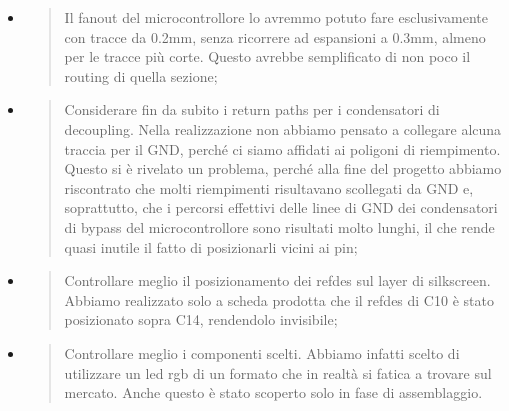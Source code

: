 \begin{itemize}
\item
  \begin{quote}
  Il fanout del microcontrollore lo avremmo potuto fare esclusivamente
  con tracce da 0.2mm, senza ricorrere ad espansioni a 0.3mm, almeno per
  le tracce più corte. Questo avrebbe semplificato di non poco il
  routing di quella sezione;
  \end{quote}
\item
  \begin{quote}
  Considerare fin da subito i return paths per i condensatori di
  decoupling. Nella realizzazione non abbiamo pensato a collegare alcuna
  traccia per il GND, perché ci siamo affidati ai poligoni di
  riempimento. Questo si è rivelato un problema, perché alla fine del
  progetto abbiamo riscontrato che molti riempimenti risultavano
  scollegati da GND e, soprattutto, che i percorsi effettivi delle linee
  di GND dei condensatori di bypass del microcontrollore sono risultati
  molto lunghi, il che rende quasi inutile il fatto di posizionarli
  vicini ai pin;
  \end{quote}
\item
  \begin{quote}
  Controllare meglio il posizionamento dei refdes sul layer di
  silkscreen. Abbiamo realizzato solo a scheda prodotta che il refdes di
  C10 è stato posizionato sopra C14, rendendolo invisibile;
  \end{quote}
\item
  \begin{quote}
  Controllare meglio i componenti scelti. Abbiamo infatti scelto di
  utilizzare un led rgb di un formato che in realtà si fatica a trovare sul
  mercato. Anche questo è stato scoperto solo in fase di assemblaggio.
  \end{quote}
\end{itemize}
